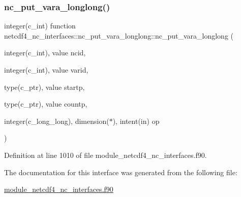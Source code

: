 \subsubsection{\texorpdfstring{nc\+\_\+put\+\_\+vara\+\_\+longlong()}{nc\_put\_vara\_longlong()}}
{\footnotesize\ttfamily integer(c\+\_\+int) function netcdf4\+\_\+nc\+\_\+interfaces\+::nc\+\_\+put\+\_\+vara\+\_\+longlong\+::nc\+\_\+put\+\_\+vara\+\_\+longlong (\begin{DoxyParamCaption}\item[{integer(c\+\_\+int), value}]{ncid,  }\item[{integer(c\+\_\+int), value}]{varid,  }\item[{type(c\+\_\+ptr), value}]{startp,  }\item[{type(c\+\_\+ptr), value}]{countp,  }\item[{integer(c\+\_\+long\+\_\+long), dimension($\ast$), intent(in)}]{op }\end{DoxyParamCaption})}



Definition at line 1010 of file module\+\_\+netcdf4\+\_\+nc\+\_\+interfaces.\+f90.



The documentation for this interface was generated from the following file\+:\begin{DoxyCompactItemize}
\item 
\hyperlink{module__netcdf4__nc__interfaces_8f90}{module\+\_\+netcdf4\+\_\+nc\+\_\+interfaces.\+f90}\end{DoxyCompactItemize}
